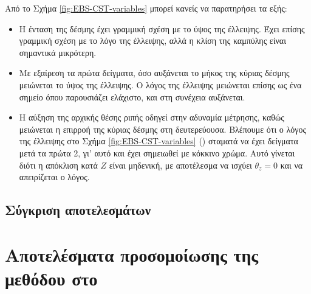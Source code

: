 Από το Σχήμα \ref{fig:EBS-CST-variables} μπορεί κανείς να παρατηρήσει τα εξής:
\begin{itemize}
\item Η ένταση της δέσμης έχει γραμμική σχέση με το ύψος της έλλειψης. 
Έχει επίσης γραμμική σχέση με το λόγο της έλλειψης, αλλά η κλίση της καμπύλης είναι σημαντικά μικρότερη.
\item Με εξαίρεση τα πρώτα δείγματα, όσο αυξάνεται το μήκος της κύριας δέσμης μειώνεται το ύψος της έλλειψης.
Ο λόγος της έλλειψης μειώνεται επίσης ως ένα σημείο όπου παρουσιάζει ελάχιστο, και στη συνέχεια αυξάνεται.
\item Η αύξηση της αρχικής θέσης ριπής οδηγεί στην αδυναμία μέτρησης, καθώς μειώνεται η επιρροή της κύριας δέσμης στη δευτερεύουσα.
Βλέπουμε ότι ο λόγος της έλλειψης στο Σχήμα \ref{fig:EBS-CST-variables} () σταματά να έχει δείγματα μετά τα πρώτα 2, γι' αυτό και έχει σημειωθεί με κόκκινο χρώμα.
Αυτό γίνεται διότι η απόκλιση κατά $Z$ είναι μηδενική, με αποτέλεσμα να ισχύει $\theta_z = 0$ και να απειρίζεται ο λόγος.
\end{itemize}

\subsection{Σύγκριση αποτελεσμάτων}






\section{Αποτελέσματα προσομοίωσης της μεθόδου στο }





